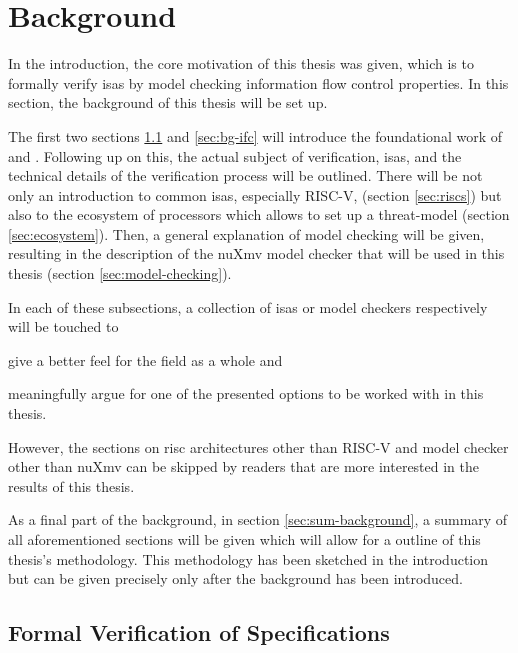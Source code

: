 
\chapter{Background}
\label{chp:background}

In the introduction, the core motivation of this thesis was given, which is to formally verify \glspl{isa} by model checking information flow control properties.
In this section, the background of this thesis will be set up.

The first two sections \ref{sec:verify-spec} and \ref{sec:bg-ifc} will introduce the foundational work of \citeauthor{Reid17} \cite{Reid17} and \citeauthor{Ferraiuolo17} \cite{Ferraiuolo17}.
Following up on this, the actual subject of verification, \glspl{isa}, and the technical details of the verification process will be outlined.
There will be not only an introduction to common \glspl{isa}, especially RISC-V, (section \ref{sec:riscs}) but also to the ecosystem of processors which allows to set up a threat-model (section \ref{sec:ecosystem}).
Then, a general explanation of model checking will be given, resulting in the description of the nuXmv model checker that will be used in this thesis (section \ref{sec:model-checking}).

In each of these subsections, a collection of \glspl{isa} or model checkers respectively will be touched to \begin{enumerate*}[label=\alph*)]
    \item give a better feel for the field as a whole and
    \item meaningfully argue for one of the presented options to be worked with in this thesis.
\end{enumerate*}
However, the sections on \gls{risc} architectures other than RISC-V and model checker other than nuXmv can be skipped by readers that are more interested in the results of this thesis.

As a final part of the background, in section \ref{sec:sum-background}, a summary of all aforementioned sections will be given which will allow for a outline of this thesis's methodology.
This methodology has been sketched in the introduction but can be given precisely only after the background has been introduced.

\section{Formal Verification of Specifications}
\label{sec:verify-spec}

